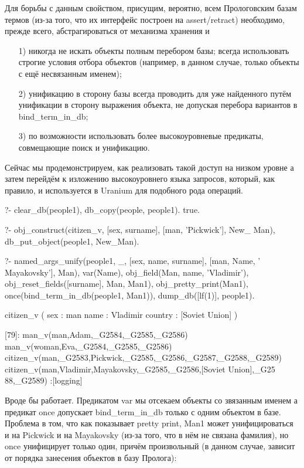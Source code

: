 \documentclass[a4paper]{book}
\def\ur{Uranium}
\begin{document}
Для борьбы с данным свойством, присущим, вероятно, всем
Прологовским базам термов (из-за того, что их интерфейс построен
на assert/retract) необходимо, прежде всего, абстрагироваться от
механизма хранения и 
\begin{itemize}
\item[1)] никогда не искать объекты полным перебором базы; всегда
  использовать строгие условия отбора объектов (например, в
  данном случае, только объекты с ещё несвязанным именем);
\item[2)] унификацию в сторону базы всегда проводить для уже
  найденного путём унификации в сторону выражения объекта, не
  допуская перебора вариантов в bind\_term\_in\_db;
\item[3)] по возможности использовать более высокоуровневые
  предикаты, совмещающие поиск и унификацию.
\end{itemize}

Сейчас мы продемонстрируем, как реализовать такой доступ на
низком уровне а затем перейдём к изложению высокоуровнего языка
запросов, который, как правило, и используется в \ur{} для
подобного рода операций.

\begin{example}{}{}
?- clear_db(people1), db_copy(people, people1).
true.

?- obj_construct(citizen_v, 
      [sex, surname], [man, 'Pickwick'], New_ Man), 
   db_put_object(people1, New_Man).
\end{example}

\begin{example}{}{}
?- named_args_unify(people1, _, 
      [sex, name, surname], [man, Name, ' Mayakovsky'], Man), 
   var(Name), 
   obj_field(Man, name, 'Vladimir'), 
   obj_reset_fields([surname], Man, Man1), 
   obj_pretty_print(Man1), 
   once(bind_term_in_db(people1, Man1)), 
   dump_db([lf(1)], people1).

citizen_v ( 
  sex : man 
  name : Vladimir 
  country : [Soviet Union] 
) 

[79]: man_v(man,Adam,_G2584,_G2585,_G2586) 
man_v(woman,Eva,_G2584,_G2585,_G2586) 
citizen_v(man,_G2583,Pickwick,_G2585,_G2586,_G2587,_G2588,_G2589) 
citizen_v(man,Vladimir,Mayakovsky,_G2585,_G2586,[Soviet Union],_G25
88,_G2589)                                                        
 :[logging]
\end{example}

Вроде бы работает. Предикатом var мы отсекаем объекты со
звязанным именем а предикат once допускает bind\_term\_in\_db
только с одним объектом в базе. Проблема в том, что как
показывает pretty print, Man1 может унифицироваться и на Pickwick
и на Mayakovsky (из-за того, что в нём не связана фамилия), но
once унифицирует только один, причём произвольный (в данном
случае, зависит от порядка занесения объектов в базу Пролога):
\end{document}
